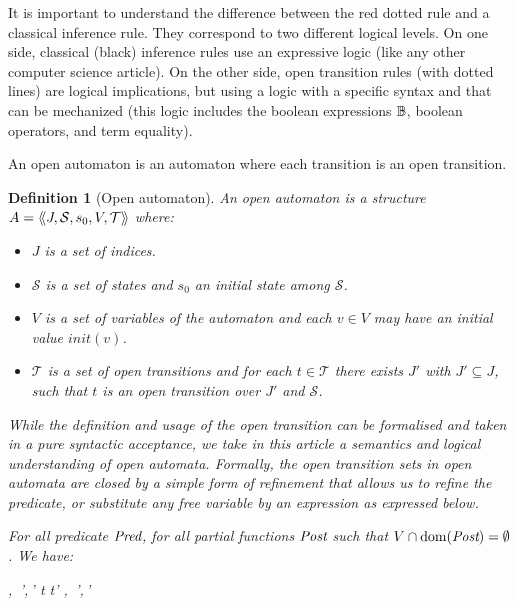 \documentclass{lmcs}
\makeatletter
\newcommand{\raisemath}[1]{\mathpalette{\raisem@th{#1}}}
\newcommand{\raisem@th}[3]{\raisebox{#1}{$#2#3$}}
\newcommand{\shortotimes}{\!\otimes\!}
\newtheorem{definition}{Definition}
\makeatother
\begin{document}
It is important to understand the difference between the red dotted rule and a classical 
inference rule. They correspond to two different logical levels.
On one side, classical (black) inference rules  use  an expressive logic (like any other computer science article).
 On the other side, open transition rules (with dotted lines) are logical implications, but using a  logic with a specific syntax and that can be mechanized (this logic includes the boolean expressions $\mathbb{B}$, boolean operators, and term equality).


An open automaton is  an automaton where each transition is an open transition.
\begin{definition}[Open automaton]
	\label{def:open-automaton}
	An \emph{open automaton} is a structure\\ $A =
	\langle\hspace{-0.45ex}\langle J,\mathcal{S},s_0,V,\mathcal{T}\rangle\hspace{-0.45ex}\rangle$ where:
	\begin{itemize}
		\item[$\bullet$]   $J$ is a  set of indices.
		\item[$\bullet$]   $\mathcal{S}$ is a set of states and $s_0$ an initial state
		  among $\mathcal{S}$.
 \item[$\bullet$] $V$ is a set of variables of the automaton
		and each $v\in V$ may have an initial value $init(v)$.
		\item[$\bullet$] $\mathcal{T}$ is a set of open transitions and for each
		$t\in \mathcal{T}$ there exists  $J'$ with  $J'
		\subseteq J$, such that $t$ is an open transition over  $J'$
		and  $\mathcal{S}$.
		
	\end{itemize}

While the definition and usage of the open transition can be formalised and taken in a pure syntactic acceptance, we take in this article a semantics and logical understanding of open automata. 
Formally, the open transition sets in open automata are closed by a simple form of refinement that
allows us to refine the predicate, or substitute any free variable by
an expression as expressed below.

For all predicate $\Pred$, for all partial functions $\Post$ such that $V\cap \dom(\Post)=\emptyset$. We have: 
		 \begin{mathpar}
    \openrule
         {
           \set{\beta}, \Pred\,',\Post\,'}
          {t \OTarrow {\alpha} t'}\in{}
\implies
    \openrule
         {
           \set{\beta}\subst{\Post}, \Pred\,'\subst{\Post}\land\Pred,\Post\shortotimes\Post\,'}
         {\raisemath{-2pt}{t \OTarrow {\alpha\subst{\Post}} {t'}}{}}
 \in{}
\end{mathpar}
\end{definition}
\end{document}
